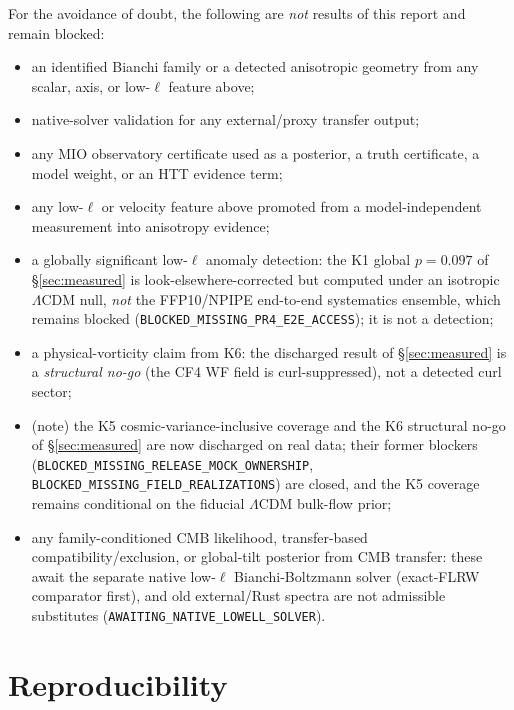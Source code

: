 \documentclass[11pt,a4paper]{article}
\theoremstyle{plain}
\theoremstyle{definition}
\begin{document}
For the avoidance of doubt, the following are \emph{not} results of
this report and remain blocked:
\begin{itemize}[leftmargin=1.4em,itemsep=2pt]
  \item an identified Bianchi family or a detected anisotropic
        geometry from any scalar, axis, or low-$\ell$ feature above;
  \item native-solver validation for any external/proxy transfer
        output;
  \item any MIO observatory certificate used as a posterior, a
        truth certificate, a model weight, or an HTT evidence term;
  \item any low-$\ell$ or velocity feature above promoted from a
        model-independent measurement into anisotropy evidence;
  \item a globally significant low-$\ell$ anomaly detection: the K1
        global $p=0.097$ of \S\ref{sec:measured} is look-elsewhere-corrected
        but computed under an isotropic $\Lambda$CDM null, \emph{not} the
        FFP10/NPIPE end-to-end systematics ensemble, which remains blocked
        (\texttt{BLOCKED\_MISSING\_PR4\_E2E\_ACCESS}); it is not a detection;
  \item a physical-vorticity claim from K6: the discharged result of
        \S\ref{sec:measured} is a \emph{structural no-go} (the CF4 WF field is
        curl-suppressed), not a detected curl sector;
  \item (note) the K5 cosmic-variance-inclusive coverage and the K6 structural
        no-go of \S\ref{sec:measured} are now discharged on real data; their
        former blockers (\texttt{BLOCKED\_MISSING\_RELEASE\_MOCK\_OWNERSHIP},
        \texttt{BLOCKED\_MISSING\_FIELD\_REALIZATIONS}) are closed, and the K5
        coverage remains conditional on the fiducial $\Lambda$CDM bulk-flow prior;
  \item any family-conditioned CMB likelihood, transfer-based
        compatibility/exclusion, or global-tilt posterior from CMB
        transfer: these await the separate native low-$\ell$
        Bianchi-Boltzmann solver (exact-FLRW comparator first),
        and old external/Rust spectra are not admissible substitutes
        (\texttt{AWAITING\_NATIVE\_LOWELL\_SOLVER}).
\end{itemize}

\section{Reproducibility}
\label{sec:repro}
\end{document}
